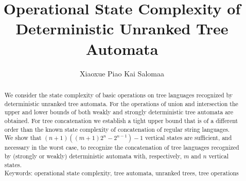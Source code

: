 \documentclass[copyright]{eptcs}
\begin{document}
\def\bbbn{{\rm I\!N}} \newcommand{\latex}{\LaTeX}
\newcommand{\tex}{\TeX}
\newcommand{\set}[1]{\{#1\}}
\newcommand{\flor}[1]{\lfloor{#1}\rfloor}

\def \prend{\vrule depth-1pt height7pt width6pt}
\def \proof{\bigbreak\noindent{\bf Proof.\ \ }}
\def \endpf{{\ \ \prend \medbreak}}

\def\vs{\vspace{1mm}}

\newtheorem{theorem}{T\/heorem}[section]
\newtheorem{apptheo}{T\/heorem}[section]
\newtheorem{corollary}{Corollary}[section]
\newtheorem{definition}{Definition}[section]
\newtheorem{lemma}{Lemma}[section]
\newtheorem{applem}{Lemma}[section]
\newtheorem{example}{Example}[section]
    \newtheorem{appexample}{Example}[section]
\newtheorem{fact}{Fact}[section]
\newtheorem{claim}{Claim}[section]
\newtheorem{proposition}{Proposition}
\newtheorem{remark}{Remark}[section]
\newcommand{\propersubset}{\subset}
\newtheorem{problem}{Open problem}

\title{Operational State Complexity of\\
  Deterministic Unranked Tree Automata}


\author{Xiaoxue Piao \qquad\qquad Kai Salomaa
}
\def\titlerunning{Unranked Tree Automata}
\def\authorrunning{X. Piao \& K. Salomaa}


\maketitle

\begin{abstract}
    We consider  the state complexity of
basic operations on tree languages recognized by
deterministic unranked
     tree automata.
     For the operations of
     union and intersection the
upper and lower bounds of both weakly and strongly
 deterministic
     tree automata are obtained.
For tree concatenation we establish a tight upper bound that
is of a different order than the known state complexity
of concatenation of regular string languages.
We show that $(n+1) ( (m+1)2^n-2^{n-1} )-1$
     vertical states are sufficient, and
necessary in the worst case, to recognize the concatenation
of tree languages recognized by  (strongly or
weakly) deterministic automata with, respectively,
     $m$ and $n$ vertical states.\\
Keywords:
     operational state complexity, tree automata,
     unranked trees, tree operations
\end{abstract}
\end{document}
